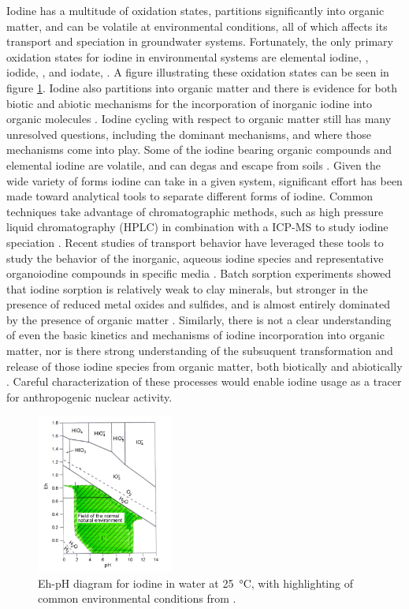 \documentclass[twoside,12pt,titlepage]{article}
\begin{document}
\par Iodine has a multitude of oxidation states, partitions significantly into organic matter, and can be volatile at environmental conditions, all of which affects its transport and speciation in groundwater systems. Fortunately, the only primary oxidation states for iodine in environmental systems are elemental iodine, , iodide, , and iodate,  \cite{Hou2009}. A figure illustrating these oxidation states can be seen in figure \ref{fig:IodineSpeciation}. Iodine also partitions into organic matter and there is evidence for both biotic and abiotic mechanisms for the incorporation of inorganic iodine into organic molecules \cite{Gilfedder2010, Yamaguchi2008}. Iodine cycling with respect to organic matter still has many unresolved questions, including the dominant mechanisms, and where those mechanisms come into play. Some of the iodine bearing organic compounds and elemental iodine are volatile, and can degas and escape from soils \cite{Hu2009}. Given the wide variety of forms iodine can take in a given system, significant effort has been made toward analytical tools to separate different forms of iodine. Common techniques take advantage of chromatographic methods, such as high pressure liquid chromatography (HPLC) in combination with a ICP-MS to study iodine speciation \cite{Wuilloud2005}. Recent studies of transport behavior have leveraged these tools to study the behavior of the inorganic, aqueous iodine species and representative organoiodine compounds in specific media \cite{Hu2005}. Batch sorption experiments showed that iodine sorption is relatively weak to clay minerals, but stronger in the presence of reduced metal oxides and sulfides, and is almost entirely dominated by the presence of organic matter \cite{Assemi1994,Fuhrmann1998}. Similarly, there is not a clear understanding of even the basic kinetics and mechanisms of iodine incorporation into organic matter, nor is there strong understanding of the subsuquent transformation and release of those iodine species from organic matter, both biotically and abiotically \cite{Yamaguchi2008,Kaplan2014}. Careful characterization of these processes would enable iodine usage as a tracer for anthropogenic nuclear activity.

\begin{figure}
\centering
\includegraphics[width = 0.4\textwidth]{IodineSpeciation.png}
\caption{Eh-pH diagram for iodine in water at \SI{25}{\degreeCelsius}, with highlighting of common environmental conditions from \cite{Hou2009}.}
\label{fig:IodineSpeciation}
\end{figure}
\end{document}

